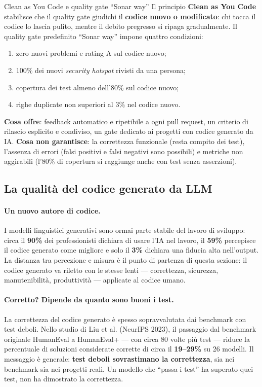 \documentclass[12pt]{extarticle}
\begin{document}
\begin{cbox}{Clean as You Code e quality gate ``Sonar way''}
Il principio \textbf{Clean as You Code} stabilisce che il quality gate giudichi il \textbf{codice nuovo o modificato}: chi tocca il codice lo lascia pulito, mentre il debito pregresso si ripaga gradualmente. Il quality gate predefinito ``Sonar way'' impone quattro condizioni:
\begin{enumerate}
    \item zero nuovi problemi e rating A sul codice nuovo;
    \item 100\% dei nuovi \textit{security hotspot} rivisti da una persona;
    \item copertura dei test almeno dell'80\% sul codice nuovo;
    \item righe duplicate non superiori al 3\% nel codice nuovo.
\end{enumerate}
\noindent \textbf{Cosa offre}: feedback automatico e ripetibile a ogni pull request, un criterio di rilascio esplicito e condiviso, un gate dedicato ai progetti con codice generato da IA. \textbf{Cosa non garantisce}: la correttezza funzionale (resta compito dei test), l'assenza di errori (falsi positivi e falsi negativi sono possibili) e metriche non aggirabili (l'80\% di copertura si raggiunge anche con test senza asserzioni).
\end{cbox}

\subsection{La qualità del codice generato da LLM}

\paragraph{Un nuovo autore di codice.}
I modelli linguistici generativi sono ormai parte stabile del lavoro di sviluppo: circa il \textbf{90\%} dei professionisti dichiara di usare l'IA nel lavoro, il \textbf{59\%} percepisce il codice generato come migliore e solo il \textbf{3\%} dichiara una fiducia alta nell'output. La distanza tra percezione e misura è il punto di partenza di questa sezione: il codice generato va riletto con le stesse lenti — correttezza, sicurezza, manutenibilità, produttività — applicate al codice umano.

\paragraph{Corretto? Dipende da quanto sono buoni i test.}
La correttezza del codice generato è spesso sopravvalutata dai benchmark con test deboli. Nello studio di Liu et al. (NeurIPS 2023), il passaggio dal benchmark originale HumanEval a HumanEval+ — con circa 80 volte più test — riduce la percentuale di soluzioni considerate corrette di circa il \textbf{19--29\%} su 26 modelli. Il messaggio è generale: \textbf{test deboli sovrastimano la correttezza}, sia nei benchmark sia nei progetti reali. Un modello che ``passa i test'' ha superato quei test, non ha dimostrato la correttezza.
\end{document}
